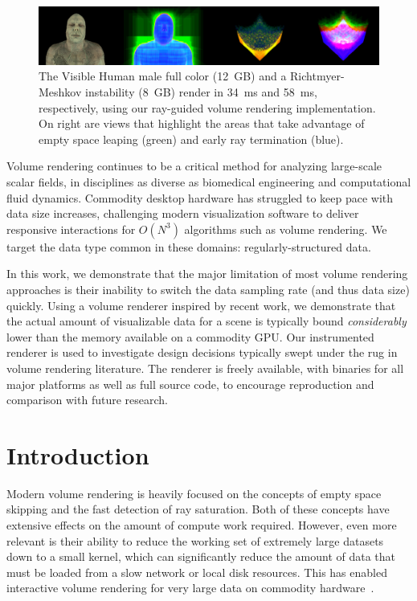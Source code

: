 \begin{figure}
  \includegraphics[draft=\isDraft, width=1.00\linewidth]{images/rg/teaser.png}
  \caption{The Visible Human male full color (\tjftilde{}12~GB) and
  a Richtmyer-Meshkov instability (\tjftilde{}8~GB) render in 34~ms
  and 58~ms, respectively, using our ray-guided volume rendering
  implementation.  On right are views that highlight the areas
  that take advantage of empty space leaping (green) and early ray
  termination (blue).}
  \label{figrg:teaser}
\end{figure}

Volume rendering continues to be a critical method for analyzing
large-scale scalar fields, in disciplines as diverse as biomedical
engineering and computational fluid dynamics.
Commodity desktop hardware has struggled to keep pace with data
size increases, challenging modern visualization software to
deliver responsive interactions for $O(N^3)$ algorithms such as
volume rendering.  We target the data type common in these domains:
regularly-structured data.

In this work, we demonstrate that the major limitation of most volume
rendering approaches is their inability to switch the data sampling
rate (and thus data size) quickly.  Using a volume renderer inspired by
recent work, we demonstrate that the actual amount of visualizable data
for a
scene is typically bound \emph{considerably} lower than the memory
available on a commodity GPU.  Our instrumented renderer is used to
investigate design decisions typically swept under the rug in volume
rendering literature.  The renderer is freely available, with binaries
for all major platforms as well as full source code, to encourage
reproduction and comparison with future research.

\section{Introduction}

Modern volume rendering is heavily focused on the concepts of empty
space skipping and the fast detection of ray saturation.  Both of these
concepts have extensive effects on the amount of compute work required.
However, even more relevant is their ability to reduce the working
set of extremely large datasets down to a small kernel, which can
significantly reduce the amount of data that must be loaded from a slow
network or local disk resources.  This has enabled interactive volume
rendering for very large data on commodity
hardware~\cite{Knoll:2010:BVH, Hadwiger:2012:Guided,
Crassin:2009:Gigavoxels}.

